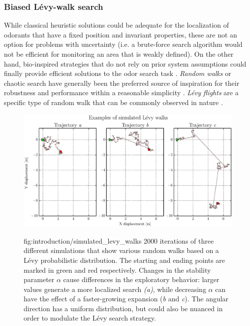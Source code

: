 \subsubsection{Biased L\'{e}vy-walk search}
\vspace{-0.3cm}
While classical heuristic solutions could be adequate for the localization of odorants that have a fixed position and invariant properties, these are not an option for problems with uncertainty (i.e. a brute-force search algorithm would not be efficient for monitoring an area that is weakly defined).
On the other hand, bio-inspired strategies that do not rely on prior system assumptions could finally provide efficient solutions to the odor search task \cite{Hein24072012, Mcgill2011, raey10, arleo07}.
\emph{Random walks} or chaotic search have generally been the preferred source of inspiration for their robustness and performance within a reasonable simplicity \cite{KongcunM09}.
\emph{L\'{e}vy flights} are a specific type of random walk that can be commonly observed in nature \cite{Reynolds2013}.


\begin{figure}[h!]
\centerline{\mbox{\includegraphics[width=15cm]{images/introduction/simulated_levy_walks.eps}}}
{fig:introduction/simulated_levy_walks}{
2000 iterations of three different simulations that show various random walks based on a L\'{e}vy probabilistic distribution. The starting and ending points are marked in green and red respectively. Changes in the stability parameter $\alpha$ cause differences in the exploratory behavior: larger values generate a more localized search \emph{(a)}, while decreasing $\alpha$ can have the effect of a faster-growing expansion (\emph{b} and \emph{c}). The angular direction has a uniform distribution, but could also be nuanced in order to modulate the L\'{e}vy search strategy.
}
\end{figure}


